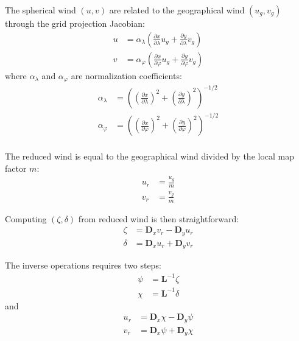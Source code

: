 \documentclass[12pt]{scrartcl}
\begin{document}
The spherical wind $(u, v)$ are related to the geographical wind $(u_g, v_g)$ through the grid projection Jacobian:
\begin{subequations}
\begin{align}
u & = \alpha_\lambda \left(\frac{\partial x}{\partial \lambda} u_g + \frac{\partial y}{\partial \lambda} v_g\right) \\
v & = \alpha_\varphi \left(\frac{\partial x}{\partial \varphi} u_g + \frac{\partial y}{\partial \varphi} v_g\right)
\end{align}
\end{subequations}
where $\alpha_\lambda$ and $\alpha_\varphi$ are normalization coefficients:
\begin{subequations}
\begin{align}
\alpha_\lambda & = \left(\left(\frac{\partial x}{\partial \lambda}\right)^2 + \left(\frac{\partial y}{\partial \lambda}\right)^2\right)^{-1/2} \\
\alpha_\varphi & = \left(\left(\frac{\partial x}{\partial \varphi}\right)^2 + \left(\frac{\partial y}{\partial \varphi}\right)^2\right)^{-1/2} \\
\end{align}
\end{subequations}

The reduced wind is equal to the geographical wind divided by the local map factor $m$:
\begin{subequations}
\begin{align}
u_r & = \frac{u_g}{m} \\
v_r & = \frac{v_g}{m}
\end{align}
\end{subequations}

Computing $(\zeta, \delta)$ from reduced wind is then straightforward:
\begin{subequations}
\begin{align}
\zeta & = \mathbf{D}_x v_r - \mathbf{D}_y u_r \\
\delta & = \mathbf{D}_x u_r + \mathbf{D}_y v_r
\end{align}
\end{subequations}

The inverse operations requires two steps:
\begin{subequations}
\begin{align}
\psi & = \mathbf{L}^{-1} \zeta \\
\chi & = \mathbf{L}^{-1} \delta
\end{align}
\end{subequations}
and
\begin{subequations}
\begin{align}
u_r & = \mathbf{D}_x \chi - \mathbf{D}_y \psi \\
v_r & = \mathbf{D}_x \psi + \mathbf{D}_y \chi
\end{align}
\end{subequations}
\end{document}

